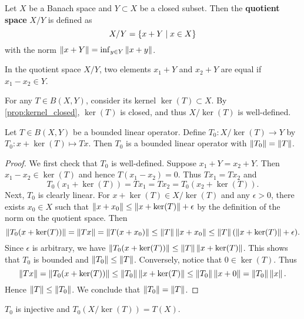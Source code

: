 \begin{definition}
    Let $X$ be a Banach space and $Y\subset X$ be a closed 
    subset. Then the \textbf{quotient space} $X/Y$ is defined as 
    \begin{equation*}
        X/Y = \left\{ x+Y \;\middle\vert\; x\in X \right\}
    \end{equation*}
    with the norm $\left\lVert {x+Y} \right\rVert = \inf_{y\in Y}\left\lVert {x+y} \right\rVert$. 
\end{definition}
\begin{remark}
    In the quotient space $X/Y$, two elements $x_1+Y$ and 
    $x_2+Y$ are equal if $x_1-x_2\in Y$.
\end{remark}
\begin{remark}
    For any $T\in B(X,Y)$, consider its kernel $\ker(T)\subset X$. 
    By \cref{prop:kernel_closed}, $\ker(T)$ is closed, and thus 
    $X/\ker(T)$ is well-defined.
\end{remark}

\begin{proposition}
    Let $T\in B(X,Y)$ be a bounded linear operator. Define $T_0:X/\ker(T)\to Y$ by 
    $T_0:x+\ker(T)\mapsto Tx$. Then $T_0$ is a bounded linear operator with 
    $\left\lVert {T_0} \right\rVert = \left\lVert {T} \right\rVert$.
\end{proposition}
\begin{proof}
    We first check that $T_0$ is well-defined. Suppose $x_1+Y = x_2+Y$. 
    Then $x_1-x_2\in\ker(T)$ and hence $T(x_1-x_2) = 0$. Thus $Tx_1 = Tx_2$ 
    and  
    \begin{equation*}
        T_0(x_1+\ker(T)) = Tx_1 = Tx_2 = T_0(x_2+\ker(T)).
    \end{equation*}
    Next, $T_0$ is clearly linear. For $x+\ker(T)\in X/\ker(T)$ 
    and any $\epsilon>0$, there exists $x_0\in X$ such that 
    $\left\lVert {x+x_0} \right\rVert\leq \left\lVert {x+\ker(T)} \right\rVert + \epsilon$ by the definition 
    of the norm on the quotient space. Then 
    \begin{equation*}
        \left\lVert {T_0(x+\ker(T))} \right\rVert = \left\lVert {Tx} \right\rVert = \left\lVert {T(x+x_0)} \right\rVert 
        \leq \left\lVert {T} \right\rVert\left\lVert {x+x_0} \right\rVert \leq \left\lVert {T} \right\rVert(\left\lVert {x+\ker(T)} \right\rVert + \epsilon).
    \end{equation*}
    Since $\epsilon$ is arbitrary, we have $\left\lVert {T_0(x+\ker(T))} \right\rVert\leq \left\lVert {T} \right\rVert\left\lVert {x+\ker(T)} \right\rVert$. 
    This shows that $T_0$ is bounded and $\left\lVert {T_0} \right\rVert\leq\left\lVert {T} \right\rVert$. 
    Conversely, notice that $0\in\ker(T)$. Thus 
    \begin{equation*}
        \left\lVert {Tx} \right\rVert = \left\lVert {T_0(x+\ker(T))} \right\rVert \leq \left\lVert {T_0} \right\rVert\left\lVert {x+\ker(T)} \right\rVert 
        \leq \left\lVert {T_0} \right\rVert\left\lVert {x+0} \right\rVert = \left\lVert {T_0} \right\rVert\left\lVert {x} \right\rVert.
    \end{equation*}
    Hence $\left\lVert {T} \right\rVert\leq\left\lVert {T_0} \right\rVert$. We conclude that $\left\lVert {T_0} \right\rVert = \left\lVert {T} \right\rVert$.
\end{proof}
\begin{remark}
    $T_0$ is injective and $T_0(X/\ker(T)) = T(X)$.
\end{remark}

